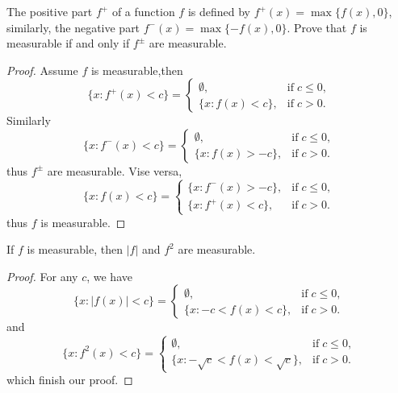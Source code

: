 \begin{pro}%
	The positive part $f^+$ of a function $f$ is defined by $f^+(x)=\max\{f(x),0\}$, similarly, the negative part $f^-(x)=\max\{-f(x),0\}$. Prove that $f$ is measurable if and only if $f^{\pm}$ are measurable.
\end{pro}
\begin{proof}
	Assume $f$ is measurable,then
	\[\{x\colon f^+(x)<c\}=
	\begin{cases}
		\emptyset,&\mbox{if}\;c\leq 0,\\
		\{x\colon f(x)<c\},&\mbox{if}\;c>0.
	\end{cases}
	\]
	Similarly
	\[\{x\colon f^-(x)<c\}=
	\begin{cases}
		\emptyset,&\mbox{if}\;c\leq 0,\\
		\{x\colon f(x)>-c\},&\mbox{if}\;c>0.
	\end{cases}\] thus $f^{\pm}$ are measurable. Vise versa, 
	\[\{x\colon f(x)<c\}=
	\begin{cases}
		\{x\colon f^-(x)>-c\},&\mbox{if}\;c\leq 0,\\
		\{x\colon f^+(x)<c\},&\mbox{if}\;c>0.
	\end{cases}\] thus $f$ is measurable.
\end{proof}

\begin{pro}%
	If $f$ is measurable, then $|f|$ and $f^2$ are measurable.
\end{pro}
\begin{proof}
	For any $c$, we have
	\[\{x\colon |f(x)|<c\}=\begin{cases}
	\emptyset,&\mbox{if}\;c\leq 0,\\
	\{x\colon -c<f(x)<c\},&\mbox{if}\;c>0.\end{cases}\]
	and
	\[\{x\colon f^2(x)<c\}=\begin{cases}
	\emptyset,&\mbox{if}\;c\leq 0,\\
	\{x\colon -\sqrt{c}<f(x)<\sqrt{c}\},&\mbox{if}\;c>0.\end{cases}
	\]
	which finish our proof.
\end{proof}

